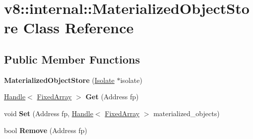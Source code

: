 \hypertarget{classv8_1_1internal_1_1_materialized_object_store}{}\section{v8\+:\+:internal\+:\+:Materialized\+Object\+Store Class Reference}
\label{classv8_1_1internal_1_1_materialized_object_store}
\subsection*{Public Member Functions}
\begin{DoxyCompactItemize}
\item 
{\bfseries Materialized\+Object\+Store} (\hyperlink{classv8_1_1internal_1_1_isolate}{Isolate} $\ast$isolate)\hypertarget{classv8_1_1internal_1_1_materialized_object_store_acd26a61a51e0b3cfef28e03f99a12b62}{}\label{classv8_1_1internal_1_1_materialized_object_store_acd26a61a51e0b3cfef28e03f99a12b62}

\item 
\hyperlink{classv8_1_1internal_1_1_handle}{Handle}$<$ \hyperlink{classv8_1_1internal_1_1_fixed_array}{Fixed\+Array} $>$ {\bfseries Get} (Address fp)\hypertarget{classv8_1_1internal_1_1_materialized_object_store_aa0d2defd96ec00cdcfc6c17c7b7d3227}{}\label{classv8_1_1internal_1_1_materialized_object_store_aa0d2defd96ec00cdcfc6c17c7b7d3227}

\item 
void {\bfseries Set} (Address fp, \hyperlink{classv8_1_1internal_1_1_handle}{Handle}$<$ \hyperlink{classv8_1_1internal_1_1_fixed_array}{Fixed\+Array} $>$ materialized\+\_\+objects)\hypertarget{classv8_1_1internal_1_1_materialized_object_store_a61f53bcfdd0d2a56191e2447a51913b6}{}\label{classv8_1_1internal_1_1_materialized_object_store_a61f53bcfdd0d2a56191e2447a51913b6}

\item 
bool {\bfseries Remove} (Address fp)\hypertarget{classv8_1_1internal_1_1_materialized_object_store_afb9c11abbbd9d73a34036157a048c324}{}\label{classv8_1_1internal_1_1_materialized_object_store_afb9c11abbbd9d73a34036157a048c324}

\end{DoxyCompactItemize}
